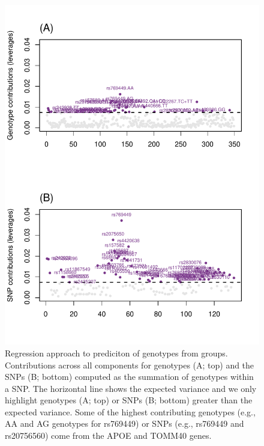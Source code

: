\documentclass[12pt]{article}
\begin{document}
\begin{figure}[!hbtp]

{\centering \includegraphics[width=.8\textwidth,height=.8\textheight]{PLSCAR_to_a_GPLS_files/figure-latex/unnamed-chunk-4-1} 

}

\caption{\label{fig:leverages_ex1} Regression approach to prediciton of genotypes from groups. Contributions across all components for genotypes (A; top) and the SNPs (B; bottom) computed as the summation of genotypes within a SNP. The horizontal line shows the expected variance and we only highlight genotypes (A; top) or SNPs (B; bottom) greater than the expected variance. Some of the highest contributing genotypes (e.g., AA and AG genotypes for rs769449) or SNPs (e.g.,  rs769449 and rs20756560) come from the APOE and TOMM40 genes.}\label{fig:unnamed-chunk-4}
\end{figure}
\end{document}
